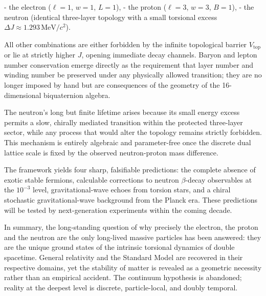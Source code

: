 \documentclass[a4paper]{article}
\begin{document}
- the electron (\(\ell=1\), \(w=1\), \(L=1\)),
- the proton (\(\ell=3\), \(w=3\), \(B=1\)),
- the neutron (identical three-layer topology with a small torsional excess \(\Delta J \approx 1.293\,\mathrm{MeV}/c^2\)).

All other combinations are either forbidden by the infinite topological barrier \(V_\text{top}\) or lie at strictly higher \(J\), opening immediate decay channels. Baryon and lepton number conservation emerge directly as the requirement that layer number and winding number be preserved under any physically allowed transition; they are no longer imposed by hand but are consequences of the geometry of the 16-dimensional biquaternion algebra.

The neutron’s long but finite lifetime arises because its small energy excess permits a slow, chirally mediated transition within the protected three-layer sector, while any process that would alter the topology remains strictly forbidden. This mechanism is entirely algebraic and parameter-free once the discrete dual lattice scale is fixed by the observed neutron-proton mass difference.

The framework yields four sharp, falsifiable predictions: the complete absence of exotic stable fermions, calculable corrections to neutron \(\beta\)-decay observables at the \(10^{-3}\) level, gravitational-wave echoes from torsion stars, and a chiral stochastic gravitational-wave background from the Planck era. These predictions will be tested by next-generation experiments within the coming decade.

In summary, the long-standing question of why precisely the electron, the proton and the neutron are the only long-lived massive particles has been answered: they are the unique ground states of the intrinsic torsional dynamics of double spacetime. General relativity and the Standard Model are recovered in their respective domains, yet the stability of matter is revealed as a geometric necessity rather than an empirical accident. The continuum hypothesis is abandoned; reality at the deepest level is discrete, particle-local, and doubly temporal.
\end{document}
